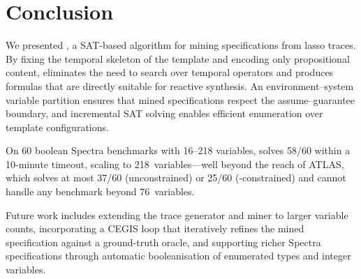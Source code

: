 \section{Conclusion}\label{sec:conclusion}

We presented \toolname, a SAT-based algorithm for mining \GRone
specifications from lasso traces.
By fixing the temporal skeleton of the \GRone template and encoding
only propositional content, \toolname eliminates the need to search
over temporal operators and produces formulas that are directly
suitable for reactive synthesis.
An environment--system variable partition ensures that mined
specifications respect the assume--guarantee boundary, and
incremental SAT solving enables efficient enumeration over template
configurations.

On 60 boolean Spectra benchmarks with 16--218 variables, \toolname
solves 58/60 within a 10-minute timeout, scaling to
218~variables---well beyond the reach of ATLAS, which solves
at most 37/60 (unconstrained) or 25/60 (\GRone-constrained)
and cannot handle any benchmark beyond 76~variables.

Future work includes extending the trace generator and miner to
larger variable counts, incorporating a CEGIS loop that
iteratively refines the mined specification against a ground-truth
oracle, and supporting richer Spectra specifications through
automatic booleanisation of enumerated types and integer variables.
